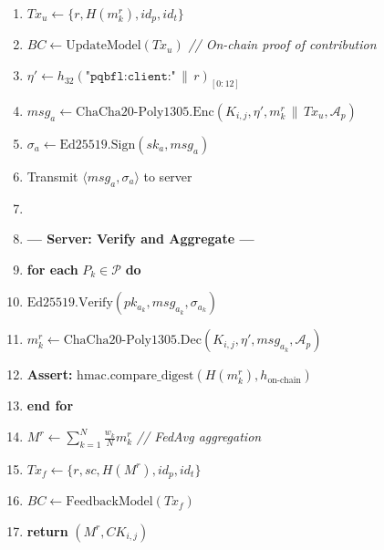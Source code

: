 \documentclass[journal, 10pt, twocolumn]{IEEEtran}
\begin{document}
\begin{figure}[!t]
\begin{enumerate}
    \item $Tx_u \leftarrow \{r, H(m_k^r), id_p, id_t\}$
    \item $BC \leftarrow \text{UpdateModel}(Tx_u)$ \quad \textit{// On-chain proof of contribution}
    \item $\eta' \leftarrow h_{32}(\texttt{"pqbfl:client:"} \,\|\, r)_{[0:12]}$
    \item $msg_a \leftarrow \text{ChaCha20-Poly1305.Enc}(K_{i,j}, \eta', m_k^r \,\|\, Tx_u, \mathcal{A}_p)$
    \item $\sigma_a \leftarrow \text{Ed25519.Sign}(sk_a, msg_a)$
    \item Transmit $\langle msg_a, \sigma_a \rangle$ to server
    \item[]
    \item[] \textbf{--- Server: Verify and Aggregate ---}
    \item \textbf{for each} $P_k \in \mathcal{P}$ \textbf{do}
    \item \quad $\text{Ed25519.Verify}(pk_{a_k}, msg_{a_k}, \sigma_{a_k})$
    \item \quad $m_k^r \leftarrow \text{ChaCha20-Poly1305.Dec}(K_{i,j}, \eta', msg_{a_k}, \mathcal{A}_p)$
    \item \quad \textbf{Assert:} $\text{hmac.compare\_digest}(H(m_k^r), h_{\text{on-chain}})$
    \item \textbf{end for}
    \item $M^r \leftarrow \sum_{k=1}^{N} \frac{w_k}{N} m_k^r$ \quad \textit{// FedAvg aggregation}
    \item $Tx_f \leftarrow \{r, sc, H(M^r), id_p, id_t\}$
    \item $BC \leftarrow \text{FeedbackModel}(Tx_f)$
    \item \textbf{return} $(M^r, CK_{i,j})$
\end{enumerate}
\hrulefill
\end{figure}
\end{document}
